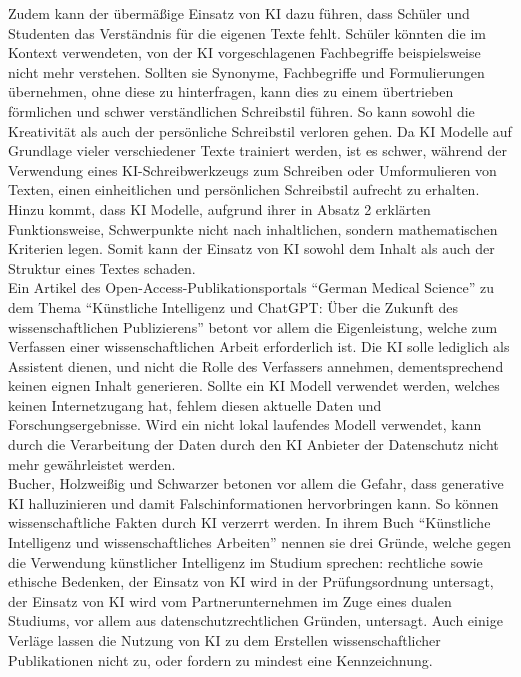 \documentclass[../main.tex]{subfiles}
\begin{document}
Zudem kann der übermäßige Einsatz von KI dazu führen, dass Schüler und Studenten das Verständnis für die eigenen Texte fehlt. Schüler könnten die im 
Kontext verwendeten, von der KI vorgeschlagenen Fachbegriffe beispielsweise nicht mehr verstehen. Sollten sie Synonyme, Fachbegriffe und Formulierungen 
übernehmen, ohne diese zu hinterfragen, kann dies zu einem übertrieben förmlichen und schwer verständlichen Schreibstil führen\cite{teachers}. 
So kann sowohl die Kreativität als auch der persönliche Schreibstil verloren gehen. Da KI Modelle auf Grundlage vieler verschiedener Texte trainiert werden, ist es
schwer, während der Verwendung eines KI-Schreibwerkzeugs zum Schreiben oder Umformulieren von Texten, einen einheitlichen und persönlichen Schreibstil aufrecht zu erhalten\cite{creativeWriting}. Hinzu kommt,
dass KI Modelle, aufgrund ihrer in Absatz 2 erklärten Funktionsweise, Schwerpunkte nicht nach inhaltlichen, sondern mathematischen Kriterien legen\cite{berensBolk}. Somit kann der 
Einsatz von KI sowohl dem Inhalt als auch der Struktur eines Textes schaden.\\

Ein Artikel des Open-Access-Publikationsportals "`German Medical Science"' zu dem Thema "`Künstliche Intelligenz und ChatGPT: Über die Zukunft des wissenschaftlichen Publizierens"'
betont vor allem die Eigenleistung, welche zum Verfassen einer wissenschaftlichen Arbeit erforderlich ist. Die KI solle lediglich als Assistent dienen, und
nicht die Rolle des Verfassers annehmen, dementsprechend keinen eignen Inhalt generieren. Sollte ein KI Modell verwendet werden, welches keinen Internetzugang hat,
fehlem diesen aktuelle Daten und Forschungsergebnisse. Wird ein nicht lokal laufendes Modell verwendet, kann durch die Verarbeitung der Daten durch den KI Anbieter
der Datenschutz nicht mehr gewährleistet werden.\cite{ZukunftWissenschaftlichesPublizieren} \\ Bucher, Holzweißig und Schwarzer betonen vor allem die Gefahr, dass 
generative KI halluzinieren und damit Falschinformationen hervorbringen kann. So können wissenschaftliche Fakten durch KI verzerrt werden. In ihrem Buch "`Künstliche Intelligenz und wissenschaftliches Arbeiten"' nennen sie drei 
Gründe, welche gegen die Verwendung künstlicher Intelligenz im Studium sprechen: rechtliche sowie ethische Bedenken, der Einsatz von KI wird in der Prüfungsordnung untersagt, 
der Einsatz von KI wird vom Partnerunternehmen im Zuge eines dualen Studiums, vor allem aus datenschutzrechtlichen Gründen, untersagt.\cite{BucherSchwarzerHolzwweißig} Auch einige Verläge lassen 
die Nutzung von KI zu dem Erstellen wissenschaftlicher Publikationen nicht zu, oder fordern zu mindest eine Kennzeichnung\cite{ZukunftWissenschaftlichesPublizieren}. 
\end{document}
